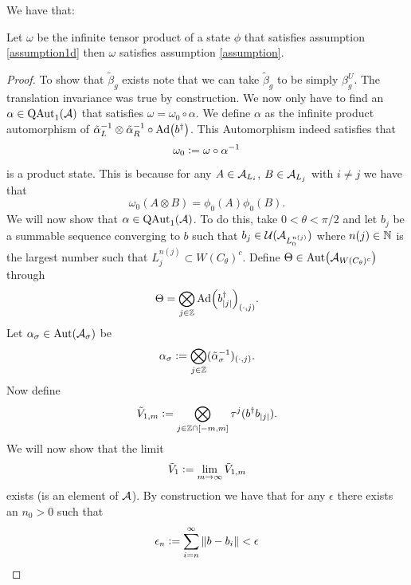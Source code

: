 \documentclass[12pt,a4paper,twoside]{article}
\numberwithin{equation}{section}
\begin{document}
We have that:
\begin{lemma}\label{lem:TensorProductStateHasWellDefinedH^2Index}
	Let $\omega$ be the infinite tensor product of a state $\phi$ that satisfies assumption \ref{assumption1d} then $\omega$ satisfies assumption \ref{assumption}.
\end{lemma}
\begin{proof}
	To show that $\tilde{\beta}_g$ exists note that we can take $\tilde{\beta}_g$ to be simply $\beta_g^{U}$. The translation invariance was true by construction. We now only have to find an $\alpha\in\QAut{\AA}$ that satisfies $\omega=\omega_0\circ\alpha$. We define $\alpha$ as the infinite product automorphism of $\tilde{\alpha}_L^{-1}\otimes\tilde{\alpha}_R^{-1}\circ\Ad{b^\dagger}$. This Automorphism indeed satisfies that
	\begin{equation}
		\omega_0\defeq \omega\circ\alpha^{-1}
	\end{equation}
	is a product state. This is because for any $A\in\AA_{L_{i}}$, $B\in\AA_{L_{j}}$ with $i\neq j$ we have that
	\begin{equation}
		\omega_0(A\otimes B)=\phi_0(A)\phi_0(B).
	\end{equation}
	We will now show that $\alpha\in\QAut{\AA}$. To do this, take $0<\theta<\pi/2$ and let $b_j$ be a summable sequence converging to $b$ such that $b_j\in\UU(\AA_{L_0^{n(j)}})$ where $n(j)\in\NN$ is the largest number such that $L_{j}^{n(j)}\subset W(C_\theta)^c$. Define $\Theta\in\Aut{\AA_{W(C_\theta)^c}}$ through
	\begin{equation}
		\Theta=\bigotimes_{j\in\ZZ}\Ad{b_\abs{j}^\dagger}_{(\cdot,j)}.
	\end{equation}
	Let $\alpha_\sigma\in\Aut{\AA_\sigma}$ be
	\begin{equation}
		\alpha_\sigma\defeq \bigotimes_{j\in\ZZ}(\tilde\alpha_\sigma^{-1})_{(\cdot,j)}.
	\end{equation}
	Now define
	\begin{equation}
		\tilde V_{1,m}\defeq\bigotimes_{j\in\ZZ\cap[-m,m]}\tau^j (b^\dagger b_\abs{j}).
	\end{equation}
	We will now show that the limit
	\begin{equation}
		\tilde V_1\defeq\lim_{m\rightarrow\infty}\tilde V_{1,m}
	\end{equation}
	exists (is an element of $\AA$). By construction we have that for any $\epsilon$ there exists an $n_0>0$ such that
	\begin{equation}
		\epsilon_n\defeq\sum_{i=n}^\infty\norm{b-b_i}<\epsilon

\end{equation}
\end{proof}
\end{document}
